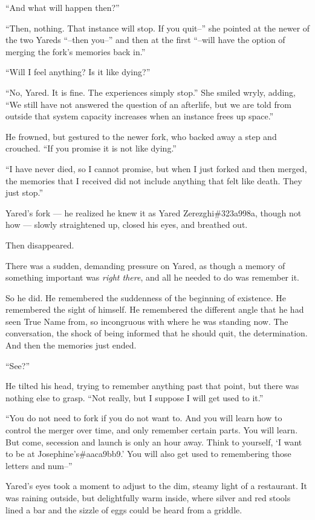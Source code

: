 ``And what will happen then?''

``Then, nothing. That instance will stop. If you quit--'' she pointed at the newer of the two Yareds ``--then you--'' and then at the first ``--will have the option of merging the fork's memories back in.''

``Will I feel anything? Is it like dying?''

``No, Yared. It is fine. The experiences simply stop.'' She smiled wryly, adding, ``We still have not answered the question of an afterlife, but we are told from outside that system capacity increases when an instance frees up space.''

He frowned, but gestured to the newer fork, who backed away a step and crouched. ``If you promise it is not like dying.''

``I have never died, so I cannot promise, but when I just forked and then merged, the memories that I received did not include anything that felt like death. They just stop.''

Yared's fork — he realized he knew it as Yared Zerezghi\#323a998a, though not how — slowly straightened up, closed his eyes, and breathed out.

Then disappeared.

There was a sudden, demanding pressure on Yared, as though a memory of something important was \emph{right there}, and all he needed to do was remember it.

So he did. He remembered the suddenness of the beginning of existence. He remembered the sight of himself. He remembered the different angle that he had seen True Name from, so incongruous with where he was standing now. The conversation, the shock of being informed that he should quit, the determination. And then the memories just ended.

``See?''

He tilted his head, trying to remember anything past that point, but there was nothing else to grasp. ``Not really, but I suppose I will get used to it.''

``You do not need to fork if you do not want to. And you will learn how to control the merger over time, and only remember certain parts. You will learn. But come, secession and launch is only an hour away. Think to yourself, `I want to be at Josephine's\#aaca9bb9.' You will also get used to remembering those letters and num--''

Yared's eyes took a moment to adjust to the dim, steamy light of a restaurant. It was raining outside, but delightfully warm inside, where silver and red stools lined a bar and the sizzle of eggs could be heard from a griddle.

